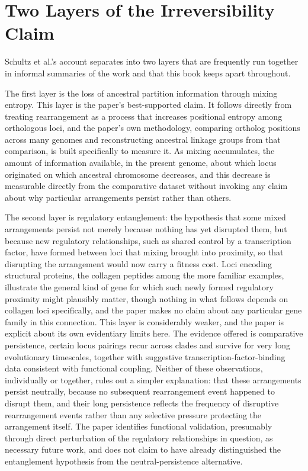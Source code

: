 \documentclass[11pt]{book}
\begin{document}
\section{Two Layers of the Irreversibility Claim}

Schultz et al.'s account separates into two layers that are frequently run together in informal summaries of the work and that this book keeps apart throughout.

The first layer is the loss of ancestral partition information through mixing entropy. This layer is the paper's best-supported claim. It follows directly from treating rearrangement as a process that increases positional entropy among orthologous loci, and the paper's own methodology, comparing ortholog positions across many genomes and reconstructing ancestral linkage groups from that comparison, is built specifically to measure it. As mixing accumulates, the amount of information available, in the present genome, about which locus originated on which ancestral chromosome decreases, and this decrease is measurable directly from the comparative dataset without invoking any claim about why particular arrangements persist rather than others.

The second layer is regulatory entanglement: the hypothesis that some mixed arrangements persist not merely because nothing has yet disrupted them, but because new regulatory relationships, such as shared control by a transcription factor, have formed between loci that mixing brought into proximity, so that disrupting the arrangement would now carry a fitness cost. Loci encoding structural proteins, the collagen peptides among the more familiar examples, illustrate the general kind of gene for which such newly formed regulatory proximity might plausibly matter, though nothing in what follows depends on collagen loci specifically, and the paper makes no claim about any particular gene family in this connection. This layer is considerably weaker, and the paper is explicit about its own evidentiary limits here. The evidence offered is comparative persistence, certain locus pairings recur across clades and survive for very long evolutionary timescales, together with suggestive transcription-factor-binding data consistent with functional coupling. Neither of these observations, individually or together, rules out a simpler explanation: that these arrangements persist neutrally, because no subsequent rearrangement event happened to disrupt them, and their long persistence reflects the frequency of disruptive rearrangement events rather than any selective pressure protecting the arrangement itself. The paper identifies functional validation, presumably through direct perturbation of the regulatory relationships in question, as necessary future work, and does not claim to have already distinguished the entanglement hypothesis from the neutral-persistence alternative.
\end{document}

